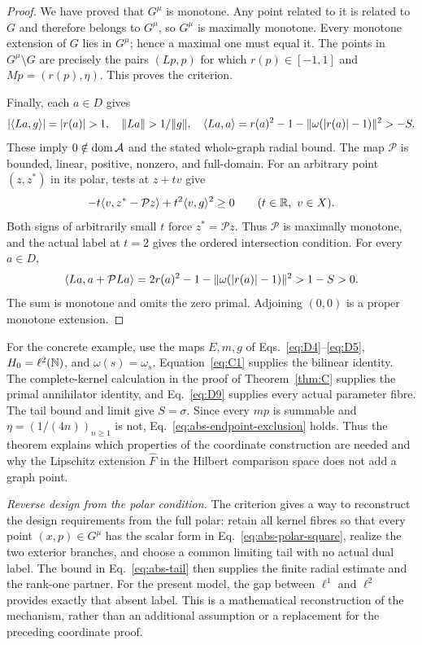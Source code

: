 \begin{proof}
We have proved that $G^\mu$ is monotone. Any point related to it
is related to $G$ and therefore belongs to $G^\mu$, so $G^\mu$
is maximally monotone. Every monotone extension of $G$ lies in
$G^\mu$; hence a maximal one must equal it. The points in
$G^\mu\setminus G$ are precisely the pairs $(Lp,p)$ for which
$r(p)\in[-1,1]$ and $Mp=(r(p),\eta)$. This proves the criterion.

Finally, each $a\in D$ gives
\[
|\pair{La}{g}|=|r(a)|>1,\quad
\|La\|>1/\|g\|,\quad
\pair{La}{a}=r(a)^2-1-\|\omega(|r(a)|-1)\|^2>-S.
\]
These imply $0\notin\operatorname{dom}\mathcal A$ and the stated whole-graph radial bound.
The map $\mathcal P$ is bounded, linear, positive, nonzero, and full-domain.
For an arbitrary point $(z,z^*)$ in its polar, tests at $z+tv$ give
\[
-t\langle v,z^*-\mathcal Pz\rangle+t^2\langle v,g\rangle^2\ge0
\qquad(t\in\mathbb R,\ v\in X).
\]
Both signs of arbitrarily small $t$ force $z^*=\mathcal Pz$.
Thus $\mathcal P$ is maximally monotone, and the actual label at
$t=2$ gives the ordered intersection condition. For every $a\in D$,
\[
\langle La,a+\mathcal PLa\rangle
=2r(a)^2-1-\|\omega(|r(a)|-1)\|^2>1-S>0.
\]
The sum is monotone and omits the zero primal. Adjoining $(0,0)$
is a proper monotone extension.
\end{proof}

For the concrete example, use the maps $E,m,g$ of
Eqs.~\eqref{eq:D4}--\eqref{eq:D5}, $H_0=\ell^2(\mathbb N)$, and
$\omega(s)=\omega_s$. Equation~\eqref{eq:C1} supplies the
bilinear identity. The complete-kernel calculation in the proof of
Theorem~\ref{thm:C} supplies the primal annihilator identity,
and Eq.~\eqref{eq:D9} supplies every actual parameter fibre.
The tail bound and limit give $S=\sigma$. Since every $mp$ is
summable and $\eta=(1/(4n))_{n\ge1}$ is not,
Eq.~\eqref{eq:abs-endpoint-exclusion} holds. Thus the theorem explains which properties of the
coordinate construction are needed and why the Lipschitz extension
$\widehat F$ in the Hilbert comparison space does not add a graph point.

\noindent\textit{Reverse design from the polar condition.}
The criterion gives a way to reconstruct the design requirements from
the full polar: retain all kernel fibres so that every point $(x,p)\in G^\mu$ has
the scalar form in Eq.~\eqref{eq:abs-polar-square}, realize the two
exterior branches, and choose a common limiting tail with no actual
dual label. The bound in Eq.~\eqref{eq:abs-tail} then supplies the
finite radial estimate and the rank-one partner. For the present model,
the gap between $\ell^1$ and $\ell^2$ provides exactly that absent
label. This is a mathematical reconstruction of the mechanism, rather
than an additional assumption or a replacement for the preceding
coordinate proof.



